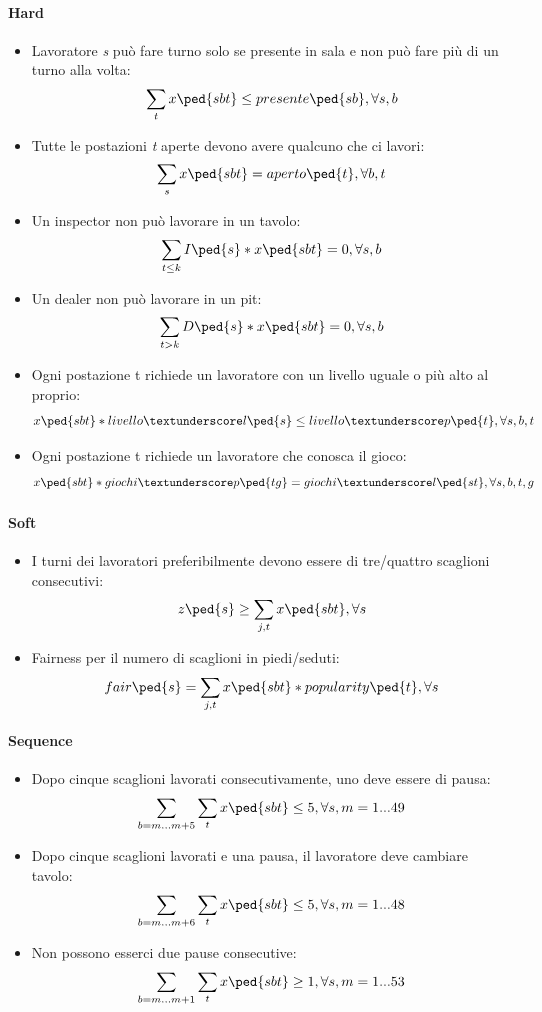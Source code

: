 \paragraph{Hard}
\begin{itemize}
    \item Lavoratore \textit{s} può fare turno solo se presente in sala e non può fare più di un turno alla volta:
    \[\sum_{t} x\ped{sbt} \le presente\ped{sb}, \forall s,b \]
    \item Tutte le postazioni \textit{t} aperte devono avere qualcuno che ci lavori:
    \[\sum_{s} x\ped{sbt} = aperto\ped{t}, \forall b,t \]
    \item Un inspector non può lavorare in un tavolo:
    \[\sum_{t \le k} I\ped{s}*x\ped{sbt} = 0, \forall s,b \]
    \item Un dealer non può lavorare in un pit:
    \[\sum_{t > k} D\ped{s}*x\ped{sbt} = 0, \forall s,b \]
    \item Ogni postazione t richiede un lavoratore con un livello uguale o più alto al proprio:
    \[x\ped{sbt}*livello\textunderscore l\ped{s} \le livello\textunderscore p\ped{t}, \forall s,b,t \]
    \item Ogni postazione t richiede un lavoratore che conosca il gioco:
    \[x\ped{sbt}*giochi\textunderscore p\ped{tg} = giochi\textunderscore l\ped{st}, \forall s,b,t,g \] 
\end{itemize}
\paragraph{Soft}
\begin{itemize}
    \item I turni dei lavoratori preferibilmente devono essere di tre/quattro scaglioni consecutivi:
    \[z\ped{s} \ge \sum_{j,t}x\ped{sbt}, \forall s \]
    \item Fairness per il numero di scaglioni in piedi/seduti:
    \[fair\ped{s} = \sum_{j,t}x\ped{sbt}*popularity\ped{t}, \forall s \]
\end{itemize}
\paragraph{Sequence} 
\begin{itemize} 
     \item Dopo cinque scaglioni lavorati consecutivamente, uno deve essere di pausa:
    \[\sum_{b = m...m+5} \sum_{t} x\ped{sbt} \le 5, \forall s, m=1...49 \]
    \item Dopo cinque scaglioni lavorati e una pausa, il lavoratore deve cambiare tavolo:
    \[\sum_{b = m...m+6} \sum_{t} x\ped{sbt} \le 5, \forall s, m=1...48 \]
    \item Non possono esserci due pause consecutive:
    \[\sum_{b = m...m+1} \sum_{t} x\ped{sbt} \ge 1, \forall s, m=1...53 \]
\end{itemize}
